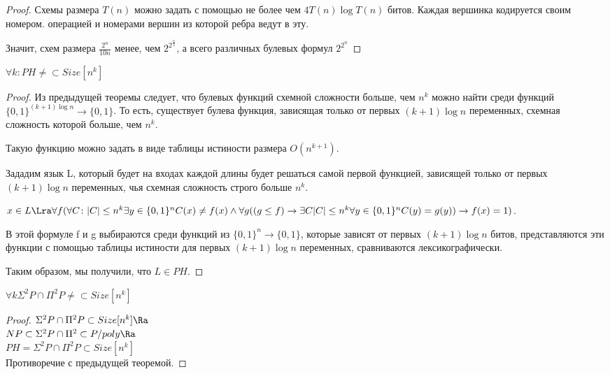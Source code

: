 \begin{proof}
	Схемы размера $T(n)$ можно задать с помощью не более
	чем $4T(n) \log T(n)$  битов. Каждая вершинка кодируется
	своим номером. операцией и номерами вершин из которой ребра ведут в эту. 

	Значит, схем размера $\frac{2^{n}}{10n}$ менее, чем $2^{2^{\frac{n}{2}}}$, 
	а всего различных булевых формул $2^{2^n}$
\end{proof}


\begin{theorem}
	$\forall k \colon PH \ne \subset Size[n^k]$\\
\end{theorem}
\begin{proof}
	Из предыдущей теоремы следует, что булевых функций схемной
	сложности больше, чем $n^k$ можно найти среди функций 
	$\{0, 1\}^{(k + 1)\log n}\to \{0, 1\}$. То есть, существует 
	булева функция, зависящая только от первых $(k + 1)\log n$ 
	переменных, схемная сложность которой больше, чем $n^k$.

	Такую функцию можно задать в виде таблицы истиности размера $O(n^{k + 1})$.

	Зададим язык L, который будет на входах каждой длины будет 
	решаться самой первой функцией, зависящей только от первых $(k + 1)\log n$
	переменных, чья схемная сложность строго больше $n^k$.

	$x \in L \Lra \forall f(\forall C \colon |C| \le n^k \exists y \in \{0, 1\}^n C(x) \ne f(x)
	\wedge \forall g((g \le f) \to \exists C|C| \le n^k \forall y \in \{0, 1\}^n C(y) = g(y)) \to f(x) = 1)$.

	 В этой формуле f и g выбираются среди функций из $\{0, 1\}^n \to \{0, 1\}$, которые
	 зависят от первых $(k + 1)\log n$ битов, представляются эти 
	 функции с помощью таблицы истиности для первых $(k + 1)\log n$ переменных, 
	 сравниваются лексикографически.

	Таким образом, мы получили, что $L \in PH$.  
\end{proof}

\begin{conseq}
	$\forall k \Sigma^2 P \cap \Pi^2P \ne \subset Size[n^k]$
\end{conseq}
\begin{proof}
	$\Sigma^2P \cap \Pi^2P \subset Size[n^k] \Ra $\\
	$NP \subset \Sigma^2P \cap \Pi^2 \subset P/poly \Ra$\\
	$PH = \Sigma^2P \cap \Pi^2P \subset Size[n^k]$\\
	Противоречие с предыдущей теоремой. 
\end{proof}

